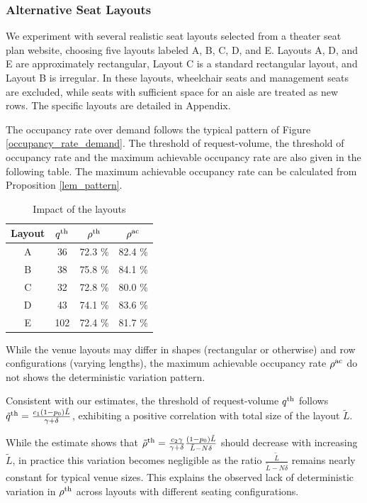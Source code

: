 \subsubsection{Alternative Seat Layouts}
We experiment with several realistic seat layouts selected from a theater seat plan website, choosing five layouts labeled A, B, C, D, and E. Layouts A, D, and E are approximately rectangular, Layout C is a standard rectangular layout, and Layout B is irregular. In these layouts, wheelchair seats and management seats are excluded, while seats with sufficient space for an aisle are treated as new rows. The specific layouts are detailed in Appendix.

The occupancy rate over demand follows the typical pattern of Figure \ref{occupancy_rate_demand}. The threshold of request-volume, the threshold of occupancy rate and the maximum achievable occupancy rate are also given in the following table. The maximum achievable occupancy rate can be calculated from Proposition \ref{lem_pattern}.

\begin{table}[ht]
  \centering
  \caption{Impact of the layouts}
  \begin{tabular}{cccc}
  \hline
  \hline
   Layout & $q^{\textup{th}}$ & $\rho^{\textup{th}}$ & $\rho^{\textup{ac}}$ \\
  \hline
   A & 36 & 72.3 \% & 82.4 \% \\
   B & 38 & 75.8 \% & 84.1 \% \\
   C & 32 & 72.8 \% & 80.0 \% \\
   D & 43 & 74.1 \%  & 83.6 \% \\
   E & 102 & 72.4 \% & 81.7 \% \\
   \hline
   \hline
  \end{tabular}
\end{table}

While the venue layouts may differ in shapes (rectangular or otherwise) and row configurations (varying lengths), the maximum achievable occupancy rate $\rho^{\textup{ac}}$ do not shows the deterministic variation pattern.

Consistent with our estimates, the threshold of request-volume $q^{\textup{th}}$ follows $\tilde{q}^{\textup{th}} =  \frac{c_1 (1-p_0) \tilde{L}}{\gamma + \delta}$, exhibiting a positive correlation with total size of the layout $\tilde{L}$. 

While the estimate shows that $\tilde{\rho}^{\textup{th}} = \frac{c_2 \gamma}{\gamma +\delta} \frac{(1-p_0) \tilde{L}}{\tilde{L}-N \delta}$ should decrease with increasing $\tilde{L}$, in practice this variation becomes negligible as the ratio $\frac{\tilde{L}}{\tilde{L}-N\delta}$ remains nearly constant for typical venue sizes. This explains the observed lack of deterministic variation in 
$\rho^{\textup{th}}$ across layouts with different seating configurations.


